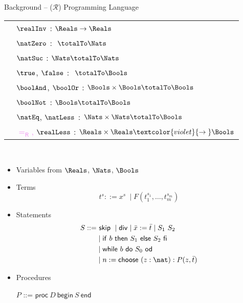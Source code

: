 \begin{frame}{Background -- \WhileCC($\mathcal{R}$) Programming Language}
\begin{multicols}{2}
{\begin{tabular}{ll}
              & $\realInv$ : $\Reals\to\Reals$ \\
              & $\natZero$ : $\ \totalTo \Nats$ \\
              & $\natSuc$ : $\Nats\totalTo\Nats$ \\
              & $\true$, $\false$ : $\ \totalTo\Bools$ \\ 
              & $\boolAnd$, $\boolOr$ : $\Bools\times\Bools\totalTo\Bools$ \\
              & $\boolNot$ : $\Bools\totalTo\Bools$ \\
              & $\natEq$, $\natLess$ : $\Nats\times\Nats\totalTo\Bools$ \\
              & \textcolor{violet}{$\mathsf{=_R}$, $\realLess$} : $\Reals\times\Reals \textcolor{violet}{\to{}}\Bools$ 
        \end{tabular}   
        }\\
        \vfill\null
        \columnbreak
        \begin{itemize}
            \pause \item Variables from $\Reals$, $\Nats$, $\Bools$ 
            \pause \item Terms
                    \[ t^s ::= x^s\ \mid F(t_1^{s_1}, \ldots , t_m^{s_m}) \]
            \pause \item Statements
                \begin{align*}
                    S ::=& \ \mathsf{skip}\
                            \mid \mathsf{div}
                            \mid \bar{x} := \bar{t}
                            \mid S_1\ S_2\\
                            &\mid \mathsf{if}\ b \ \mathsf{then}\ S_1 \ \mathsf{else}\ S_2\ \mathsf{fi}\ \\
                            &\mid \mathsf{while}\ b\ \mathsf{do}\ S_0\ \mathsf{od}
                            \\
                            &\mid n:= \mathsf{choose\ } (z: \nat): P(z,\bar{t})
                \end{align*}
            \pause \item Procedures
                \begin{center}
                    $P$ ::= $\mathsf{proc} \ D\ \mathsf{begin}\ S\ \mathsf{end}$
                \end{center}
                    
        \end{itemize}
    \end{multicols}
\end{frame}

